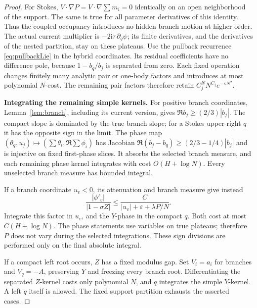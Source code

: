 \documentclass[11pt]{article}
\numberwithin{equation}{section}
\theoremstyle{definition}
\newcommand{\ii}{\mathrm i}
\newcommand{\eps}{\varepsilon}
\begin{document}
\begin{proof}
For Stokes, \(V\cdot\nabla P=V\cdot\nabla\sum m_i=0\) identically
on an open neighborhood of the support. The same is true for
all parameter derivatives of this identity. Thus the coupled
occupancy introduces no hidden branch motion at higher order.
The actual current multiplier is
\(-2\ii\tau\,\partial_q\psi\); its finite derivatives, and the
derivatives of the nested partition, stay on these plateaus.
Use the pullback recurrence \eqref{eq:pullbackLie} in the hybrid
coordinates. Its residual coefficients have no difference pole,
because \(1-b_q/b_j\) is separated from zero. Each fixed operation
changes finitely many analytic pair or one-body factors and
introduces at most polynomial \(N\)-cost. The remaining pair
factors therefore retain
\(C_j^N N^{C_j}e^{-\kappa N^2}\).

\par\smallskip\noindent\textbf{Integrating the remaining simple kernels.} For positive branch coordinates, Lemma~\ref{lem:branch}, including
its current version, gives \(\Re b_j\ge(2/3)|b_j|\).
The compact slope is dominated by the true branch slope; for a
Stokes upper-right \(q\) it has the opposite sign in the limit.
The phase map
\((\theta_q,u_j)\mapsto(\sum\theta_i,\Re\sum\phi_i)\)
has Jacobian \(\Re(b_j-b_q)\ge(2/3-1/4)|b_j|\)
and is injective on fixed first-phase slices.
It absorbs the selected branch measure, and each remaining phase
kernel integrates with cost \(O(H+\log N)\).
Every unselected branch measure has bounded integral.

If a branch coordinate \(u_v<0\), its attenuation and branch measure
give instead
\[
 \frac{|\phi'_v|}{|1-\sigma Z|}
 \le\frac C{|u_v|+\eps+\lambda P/N}.
\]
Integrate this factor in \(u_v\), and the \(Y\)-phase in the compact
\(q\). Both cost at most \(C(H+\log N)\).
The phase statements use variables on true plateaus; therefore \(P\)
does not vary during the selected integrations.
These sign divisions are performed only on the final absolute integral.

If a compact left root occurs, \(Z\) has a fixed modulus gap.
Set \(V_i=a_i\) for branches and \(V_q=-A\), preserving \(Y\)
and freezing every branch root. Differentiating the separated
\(Z\)-kernel costs only polynomial \(N\), and \(q\) integrates
the simple \(Y\)-kernel. A left \(q\) itself is allowed.
The fixed support partition exhausts the asserted cases.
\end{proof}
\end{document}
